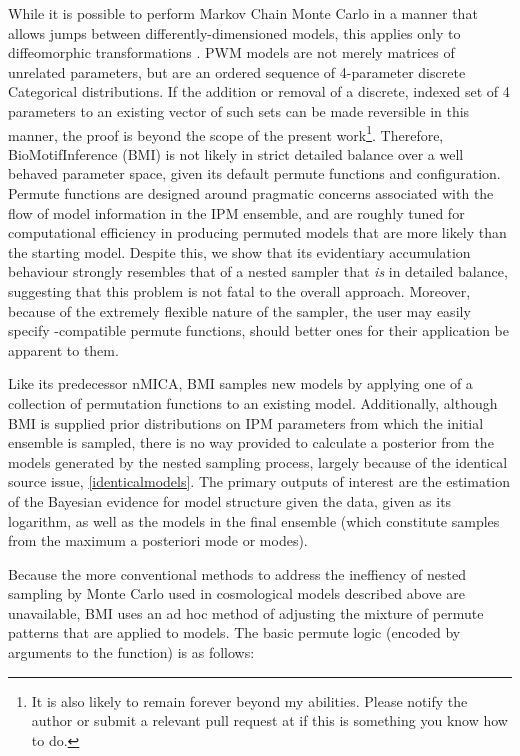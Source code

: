While it is possible to perform Markov Chain Monte Carlo in a manner that allows jumps between differently-dimensioned models, this applies only to diffeomorphic transformations \cite{Hastie2011}. PWM models are not merely matrices of unrelated parameters, but are an ordered sequence of 4-parameter discrete Categorical distributions. If the addition or removal of a discrete, indexed set of 4 parameters to an existing vector of such sets can be made reversible in this manner, the proof is beyond the scope of the present work\footnote{It is also likely to remain forever beyond my abilities. Please notify the author or submit a relevant pull request at  if this is something you know how to do.}. Therefore, BioMotifInference (BMI) is not likely in strict detailed balance over a well behaved parameter space, given its default permute functions and configuration. Permute functions are designed around pragmatic concerns associated with the flow of model information in the IPM ensemble, and are roughly tuned for computational efficiency in producing permuted models that are more likely than the starting model. Despite this, we show that its evidentiary accumulation behaviour strongly resembles that of a nested sampler that \textit{is} in detailed balance, suggesting that this problem is not fatal to the overall approach. Moreover, because of the extremely flexible nature of the sampler, the user may easily specify -compatible permute functions, should better ones for their application be apparent to them.

Like its predecessor nMICA, BMI samples new models by applying one of a collection of permutation functions to an existing model. Additionally, although BMI is supplied prior distributions on IPM parameters from which the initial ensemble is sampled, there is no way provided to calculate a posterior from the models generated by the nested sampling process, largely because of the identical source issue, \autoref{identicalmodels}. The primary outputs of interest are the estimation of the Bayesian evidence for model structure given the data, given as its logarithm, as well as the models in the final ensemble (which constitute samples from the maximum a posteriori mode or modes).

Because the more conventional methods to address the ineffiency of nested sampling by Monte Carlo used in cosmological models described above are unavailable, BMI uses an ad hoc method of adjusting the mixture of permute patterns that are applied to models. The basic permute logic (encoded by  arguments to the  function) is as follows:

